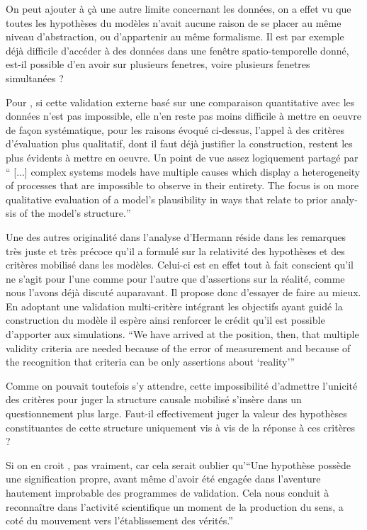 On peut ajouter à çà une autre limite concernant les données, on a effet vu que toutes les hypothèses du modèles n'avait aucune raison de se placer au même niveau d'abstraction, ou d'appartenir au même formalisme. Il est par exemple déjà difficile d'accéder à des données dans une fenêtre spatio-temporelle donné, est-il possible d'en avoir sur plusieurs fenetres, voire plusieurs fenetres simultanées ? 

Pour \autocite{Amblard2006}, si cette validation externe basé sur une comparaison quantitative avec les données n'est pas impossible, elle n'en reste pas moins difficile à mettre en oeuvre de façon systématique, pour les raisons évoqué ci-dessus, l'appel à des critères d'évaluation plus qualitatif, dont il faut déjà justifier la construction, restent les plus évidents à mettre en oeuvre. Un point de vue assez logiquement partagé par \textcite{Batty2001} \foreignquote{english}{ [...] complex systems models have multiple causes which display a heterogeneity of processes that are impossible to observe in their entirety. The focus is on more qualitative evaluation of a model’s plausibility in ways that relate to prior analysis of the model’s structure.} 


Une des autres originalité dans l'analyse d'Hermann réside dans les remarques très juste et très précoce qu'il a formulé sur la relativité des hypothèses et des critères mobilisé dans les modèles. Celui-ci est en effet tout à fait conscient qu'il ne s'agit pour l'une comme pour l'autre que d'assertions sur la réalité, comme nous l'avons déjà discuté auparavant. Il propose donc d'essayer de faire au mieux. En adoptant une validation multi-critère  intégrant les objectifs ayant guidé la construction du modèle il espère ainsi renforcer le crédit qu'il est possible d'apporter aux simulations. \foreignquote{english}{We have arrived at the position, then, that multiple validity criteria are needed because of the error of measurement and because of the recognition that criteria can be only assertions about \enquote{reality}} 

Comme on pouvait toutefois s'y attendre, cette impossibilité d'admettre l'unicité des critères pour juger la structure causale mobilisé s'insère dans un questionnement plus large. Faut-il effectivement juger la valeur des hypothèses constituantes de cette structure uniquement vis à vis de la réponse à ces critères ?

Si on en croit \textcite[17]{Besse2000}, pas vraiment, car cela serait oublier qu'\enquote{Une hypothèse possède une signification propre, avant même d’avoir été engagée dans l’aventure hautement improbable des programmes de validation. Cela nous conduit à reconnaître dans l’activité scientifique un moment de la production du sens, a coté du mouvement vers l’établissement des vérités.}

